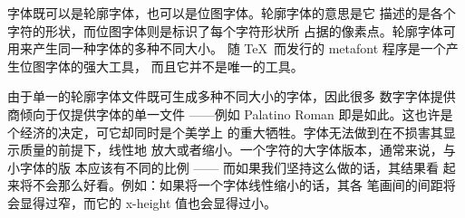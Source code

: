 字体既可以是轮廓字体，也可以是位图字体。轮廓字体的意思是它
描述的是各个字符的形状，而位图字体则是标识了每个字符形状所
占据的像素点。轮廓字体可用来产生同一种字体的多种不同大小。
随 \TeX\ 而发行的 metafont 程序是一个产生位图字体的强大工具，
而且它并不是唯一的工具。


由于单一的轮廓字体文件既可生成多种不同大小的字体，因此很多
数字字体提供商倾向于仅提供字体的单一文件 ——例如 Palatino 
Roman 即是如此。这也许是个经济的决定，可它却同时是个美学上
的重大牺牲。字体无法做到在不损害其显示质量的前提下，线性地
放大或者缩小。一个字符的大字体版本，通常来说，与小字体的版
本应该有不同的比例 —— 而如果我们坚持这么做的话，其结果看
起来将不会那么好看。例如：如果将一个字体线性缩小的话，其各
笔画间的间距将会显得过窄，而它的 x-height 值也会显得过小。


